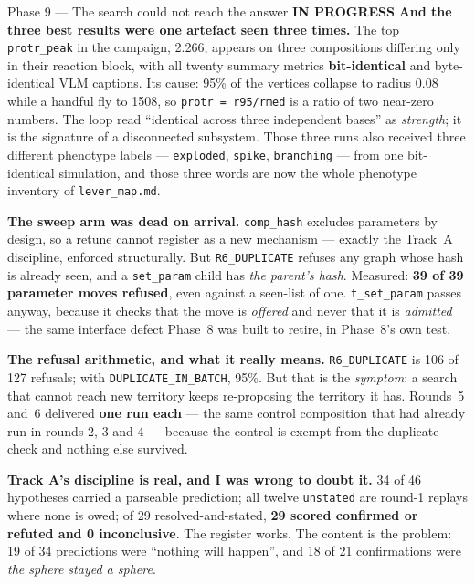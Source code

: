 \documentclass[11pt,a4paper]{article}
\newcommand{\code}[1]{\texttt{#1}}
\newcommand{\prog}{\textcolor{warn}{\textbf{IN PROGRESS}}}
\begin{document}
\begin{phasebox}{Phase 9 --- The search could not reach the answer \hfill \prog}
\textbf{And the three best results were one artefact seen three times.} The top \code{protr\_peak}
in the campaign, 2.266, appears on three compositions differing only in their reaction block, with
all twenty summary metrics \textbf{bit-identical} and byte-identical VLM captions. Its cause: 95\%
of the vertices collapse to radius 0.08 while a handful fly to 1508, so \code{protr = r95/rmed} is
a ratio of two near-zero numbers. The loop read ``identical across three independent bases'' as
\emph{strength}; it is the signature of a disconnected subsystem. Those three runs also received
three different phenotype labels --- \code{exploded}, \code{spike}, \code{branching} --- from one
bit-identical simulation, and those three words are now the whole phenotype inventory of
\code{lever\_map.md}.

\textbf{The sweep arm was dead on arrival.} \code{comp\_hash} excludes parameters by design, so a
retune cannot register as a new mechanism --- exactly the Track~A discipline, enforced
structurally. But \code{R6\_DUPLICATE} refuses any graph whose hash is already seen, and a
\code{set\_param} child has \emph{the parent's hash}. Measured: \textbf{39 of 39 parameter moves
refused}, even against a seen-list of one. \code{t\_set\_param} passes anyway, because it checks
that the move is \emph{offered} and never that it is \emph{admitted} --- the same interface defect
Phase~8 was built to retire, in Phase~8's own test.

\textbf{The refusal arithmetic, and what it really means.} \code{R6\_DUPLICATE} is 106 of 127
refusals; with \code{DUPLICATE\_IN\_BATCH}, 95\%. But that is the \emph{symptom}: a search that
cannot reach new territory keeps re-proposing the territory it has. Rounds~5 and~6 delivered
\textbf{one run each} --- the same control composition that had already run in rounds 2, 3 and 4 ---
because the control is exempt from the duplicate check and nothing else survived.

\textbf{Track A's discipline is real, and I was wrong to doubt it.} 34 of 46 hypotheses carried a
parseable prediction; all twelve \code{unstated} are round-1 replays where none is owed; of 29
resolved-and-stated, \textbf{29 scored confirmed or refuted and 0 inconclusive}. The register works.
The content is the problem: 19 of 34 predictions were ``nothing will happen'', and 18 of 21
confirmations were \emph{the sphere stayed a sphere}.


\end{phasebox}
\end{document}
